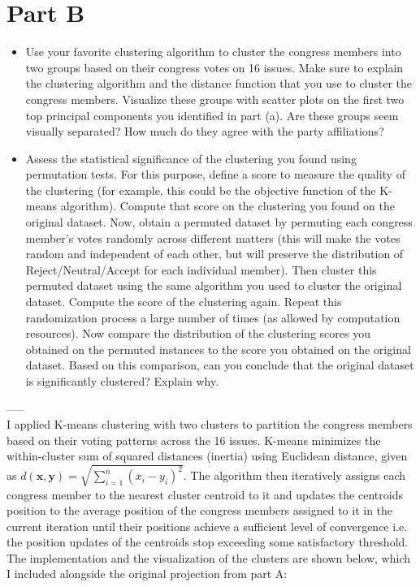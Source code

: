 \section{Part B}
\begin{itemize}
    \item
	Use your favorite clustering algorithm  to cluster the congress members into two groups based on their congress votes on 16 issues.
 Make sure to explain the clustering algorithm and the distance function that you use to cluster the congress members. 
Visualize these groups with scatter plots on the first two top principal components you identified in part (a). Are these groups seem visually separated? How much do they agree with the party affiliations? 
 
\item Assess the statistical significance of the clustering you found using permutation tests. For this purpose, define a score to measure the quality of the clustering (for example, this could be the objective function of the K-means algorithm). Compute that score on the clustering you found on the original dataset. Now, obtain a permuted dataset by permuting each congress member's votes randomly across different matters (this will make the votes random and independent of each other, but will preserve the distribution of Reject/Neutral/Accept for each individual member). Then cluster this permuted dataset using the same algorithm you used to cluster the original dataset. Compute the score of the clustering again. Repeat this randomization process a large number of times (as allowed by computation resources). Now compare the distribution of the clustering scores you obtained on the permuted instances to the score you obtained on the original dataset. Based on this comparison, can you conclude that the original dataset is significantly clustered? Explain why.  
\end{itemize}

-----\\

I applied K-means clustering with two clusters to partition the congress members based on their voting patterns across the 16 issues. K-means minimizes the within-cluster sum of squared distances (inertia) using Euclidean distance, given as $ d(\mathbf{x}, \mathbf{y}) = \sqrt{\sum_{i=1}^{n} (x_i - y_i)^2} $. The algorithm then iteratively assigns each congress member to the nearest cluster centroid to it and updates the centroids position to the average position of the congress members assigned to it in the current iteration until their positions achieve a sufficient level of convergence i.e. the position updates of the centroids stop exceeding some satisfactory threshold. The implementation and the visualization of the clusters are shown below, which I included alongside the original projection from part A:

